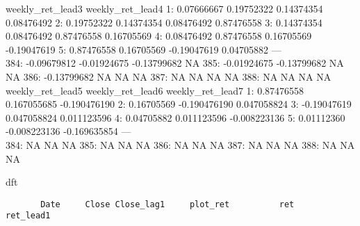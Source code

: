 \documentclass[
]{article}
\newenvironment{Shaded}{\begin{snugshade}}{\end{snugshade}}
\newcommand{\NormalTok}[1]{#1}
\begin{document}
weekly\_ret\_lead3 weekly\_ret\_lead4 1: 0.07666667 0.19752322
0.14374354 0.08476492 2: 0.19752322 0.14374354 0.08476492 0.87476558 3:
0.14374354 0.08476492 0.87476558 0.16705569 4: 0.08476492 0.87476558
0.16705569 -0.19047619 5: 0.87476558 0.16705569 -0.19047619 0.04705882
---\\
384: -0.09679812 -0.01924675 -0.13799682 NA 385: -0.01924675 -0.13799682
NA NA 386: -0.13799682 NA NA NA 387: NA NA NA NA 388: NA NA NA NA
weekly\_ret\_lead5 weekly\_ret\_lead6 weekly\_ret\_lead7 1: 0.87476558
0.167055685 -0.190476190 2: 0.16705569 -0.190476190 0.047058824 3:
-0.19047619 0.047058824 0.011123596 4: 0.04705882 0.011123596
-0.008223136 5: 0.01112360 -0.008223136 -0.169635854 ---\\
384: NA NA NA 385: NA NA NA 386: NA NA NA 387: NA NA NA 388: NA NA NA

\begin{Shaded}
\begin{Highlighting}[]
\NormalTok{dft}
\end{Highlighting}
\end{Shaded}

\begin{verbatim}
       Date     Close Close_lag1     plot_ret          ret    ret_lead1
\end{verbatim}
\end{document}
